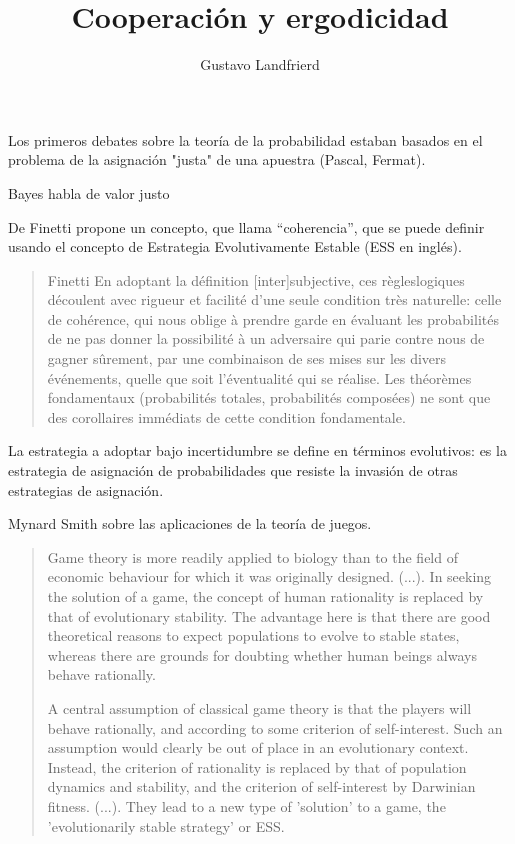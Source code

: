 \documentclass[a4paper,10pt]{article}
\title{Cooperación y ergodicidad}
\author{Gustavo Landfrierd}
\begin{document}
Los primeros debates sobre la teoría de la probabilidad estaban basados en el problema de la asignación "justa" de una apuestra (Pascal, Fermat).

Bayes habla de valor justo



De Finetti propone un concepto, que llama ``coherencia'', que se puede definir usando el concepto de Estrategia Evolutivamente Estable (ESS en inglés).

\begin{quotation} Finetti
En adoptant la définition [inter]subjective, ces règleslogiques découlent avec rigueur et facilité d’une seule condition très naturelle: celle de cohérence, qui nous oblige à prendre garde en évaluant les probabilités de ne pas donner la possibilité à un adversaire qui parie contre nous de gagner sûrement, par une  combinaison de ses mises sur les divers événements, quelle que soit l’éventualité qui se réalise.
Les théorèmes fondamentaux (probabilités totales, probabilités composées) ne sont que des corollaires immédiats de cette condition fondamentale.
\end{quotation}

La estrategia a adoptar bajo incertidumbre se define en términos evolutivos: es la estrategia de asignación de probabilidades que resiste la invasión de otras estrategias de asignación.
 

Mynard Smith sobre las aplicaciones de la teoría de juegos.
\begin{quotation}
    Game theory is more readily applied to biology than to the field of economic behaviour for which it was originally designed. (...).
    In seeking the solution of a game, the concept of human rationality is replaced by that of evolutionary stability.
    The advantage here is that there are good theoretical reasons to expect populations to evolve to stable states, whereas there are grounds for doubting whether human beings always behave rationally. \cite{maynardSmith1982-evolutionTheoryGames}
    
    A central assumption of classical game theory is that the players will behave rationally, and according to some criterion of self-interest.
    Such an assumption would clearly be out of place in an evolutionary context.
    Instead, the criterion of rationality is replaced by that of population dynamics and stability, and the criterion of self-interest by Darwinian fitness. (...).
    They lead to a new type of 'solution' to a game, the 'evolutionarily stable strategy' or ESS.
\end{quotation}
\end{document}
